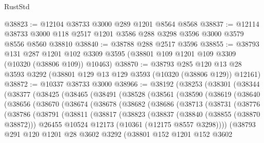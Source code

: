 \begin{lexlean}{RustStd}
\begin{coremodule}
@38823 := @12104 @38733 @3000 @289 @1201 @8564 @8568
@38837 := @12114 @38733 @3000 @118 @2517 @1201 @3586 @288 @3298 @3596 @3000 @3579 @8556 @8560 @38810
@38840 := @38788 @288 @2517 @3596
@38855 := @38793
    @131
    @287
    @1201
    @102
    @3309
    @3595
    (@38801 @109 @1201 @109 @3309 (@10320 (@38806 @109)) @10463)
@38870 := @38793
    @285
    @120
    @13
    @28
    @3593
    @3292
    (@38801 @129 @13 @129 @3593 (@10320 (@38806 @129)) @12161)
@38872 := @10337 @38733 @3000
@38966 := @38192
    (@38253
      (@38301
        (@38344
          (@38377
            (@38425
              (@38465
                (@38491
                  (@38528
                    (@38561
                      (@38590
                        (@38619
                          (@38640
                            (@38656
                              (@38670
                                (@38674
                                  (@38678
                                    (@38682
                                      (@38686
                                        (@38713
                                          (@38731
                                            (@38776
                                              (@38786
                                                (@38791
                                                  (@38811
                                                    (@38817
                                                      (@38823
                                                        (@38837
                                                          (@38840 (@38855 (@38870 @38872)))
                                                          @26455
                                                          @10524
                                                          @12173
                                                          (@10361 (@12175 @8557 @3298))))
                                                      (@38793
                                                        @291
                                                        @120
                                                        @1201
                                                        @28
                                                        @3602
                                                        @3292
                                                        (@38801
                                                          @152
                                                          @1201
                                                          @152
                                                          @3602

\end{coremodule}
\end{lexlean}
